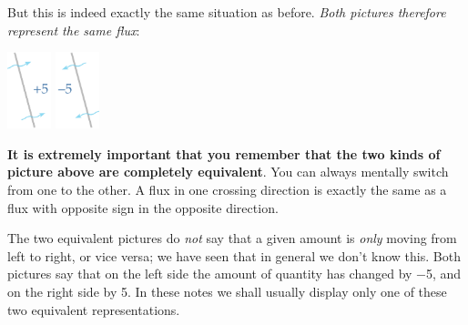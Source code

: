 \documentclass[a4paper,12pt,%
onecolumn,oneside,%
british%
]{memoir}
\renewcommand*{\|}[1][]{\nonscript\:#1\vert\nonscript\:\mathopen{}}
\newcommand*{\sect}{\S}%
\renewcommand*{\autoref}[2]{\sidepar{\vspace{-1ex}\footnotesize{\color{blue}\faIcon{%
angle-right%
}\enspace\sect\,\ref{#1} page\,\pageref{#1}}}\textcolor{blue}{#2}}
\begin{document}
But this is indeed exactly the same situation as before. \emph{Both pictures therefore represent the same flux}:\noprelistbreak
\begin{center}\label{fig:scalar_fluxes}
  \bigskip
  \hspace*{\fill}
  \includegraphics[align=c,height=6em]{images/flux_plus5c.pdf}
\qquad
\includegraphics[align=c,height=6em]{images/flux_minus5c.pdf}
\hspace*{\fill}
\end{center}

\textbf{It is extremely important that you remember that the two kinds of picture above are completely equivalent}. You can always mentally switch from one to the other. A flux in one crossing direction is exactly the same as a flux with opposite sign in the opposite direction.

The two equivalent pictures do \emph{not} say that a given amount is \emph{only} moving from left to right, or vice versa; we have seen that in general we don't know this. Both pictures say that on the left side the amount of quantity has changed by \num{-5}, and on the right side by \num{+5}. In these notes we shall usually display only one of these two equivalent representations.


\end{document}
